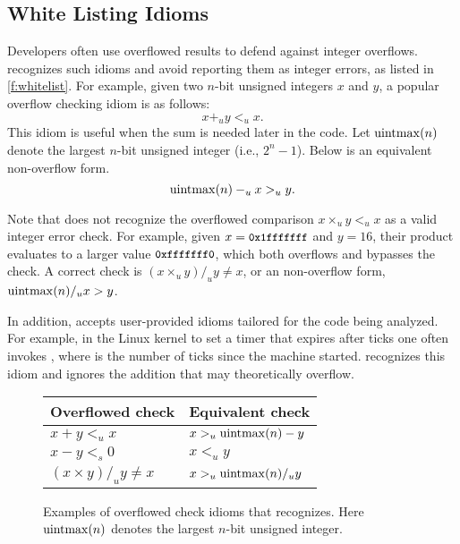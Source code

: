 \subsection{White Listing Idioms}
\label{s:sema:whitelist}

Developers often use overflowed results to defend against integer
overflows.  \sys recognizes such idioms and avoid reporting them
as integer errors, as listed in \autoref{f:whitelist}.  For example,
given two $n$-bit unsigned integers $x$ and $y$, a popular overflow
checking idiom is as follows:
\begin{equation*}
x +_u y <_u x.
\end{equation*}
This idiom is useful when the sum is needed later in the code.
Let $\operatorname{uintmax}(n)$ denote the largest $n$-bit unsigned integer (i.e.,
$2^n - 1$).  Below is an equivalent non-overflow form.
\begin{equation*}
\operatorname{uintmax}(n) -_u x >_u y.
\end{equation*}

Note that \sys does not recognize the overflowed comparison $x
\times_u y <_u x$ as a valid integer error check.  For example,
given $x = \cc{0x1fffffff}$ and $y = 16$, their product evaluates
to a larger value $\cc{0xfffffff0}$, which both overflows and
bypasses the check.  A correct check is $(x \times_u y) /_u y \neq
x$, or an non-overflow form, $\operatorname{uintmax}(n) /_u x > y$.

In addition, \sys accepts user-provided idioms tailored for the
code being analyzed.  For example, in the Linux kernel to set a
timer that expires after  ticks one often invokes
, where  is the
number of ticks since the machine started.  \sys recognizes
this idiom and ignores the addition  that may
theoretically overflow.

\begin{figure}
\centering
\begin{tabular}{ll}
\toprule
Overflowed check & Equivalent check \\ \midrule
$x + y <_u x$ & $x >_u \operatorname{uintmax}(n) - y$ \\
$x - y <_s 0$ & $x <_u y$ \\
$(x \times y) /_u y \neq x$ & $x >_u \operatorname{uintmax}(n) /_u y$   \\
\bottomrule
\end{tabular}
\caption{Examples of overflowed check idioms that \sys recognizes.
Here $\operatorname{uintmax}(n)$ denotes the largest $n$-bit unsigned integer.}
\label{f:whitelist}
\end{figure}
